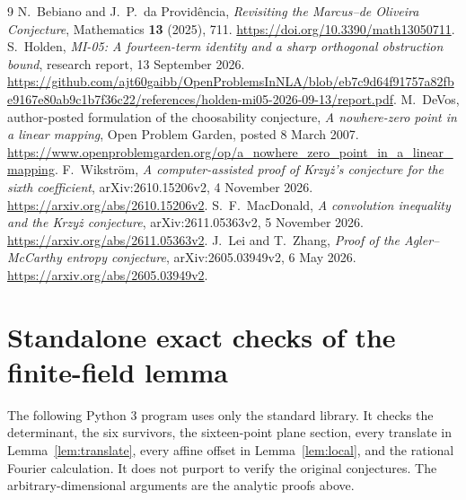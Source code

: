 \documentclass[11pt,a4paper]{article}
\begin{document}
\begin{thebibliography}{9}
N.~Bebiano and J.~P.~da Provid\^encia,
\emph{Revisiting the Marcus--de Oliveira Conjecture},
Mathematics \textbf{13} (2025), 711.
\url{https://doi.org/10.3390/math13050711}.
S.~Holden, \emph{MI-05: A fourteen-term identity and a sharp orthogonal
obstruction bound}, research report, 13 September 2026.
\url{https://github.com/ajt60gaibb/OpenProblemsInNLA/blob/eb7c9d64f91757a82fbe9167e80ab9c1b7f36c22/references/holden-mi05-2026-09-13/report.pdf}.
M.~DeVos, author-posted formulation of the choosability conjecture,
\emph{A nowhere-zero point in a linear mapping}, Open Problem Garden,
posted 8 March 2007.
\url{https://www.openproblemgarden.org/op/a_nowhere_zero_point_in_a_linear_mapping}.
F.~Wikstr\"om, \emph{A computer-assisted proof of Krzy\.{z}'s conjecture
for the sixth coefficient}, arXiv:2610.15206v2, 4 November 2026.
\url{https://arxiv.org/abs/2610.15206v2}.
S.~F.~MacDonald, \emph{A convolution inequality and the Krzy\.{z}
conjecture}, arXiv:2611.05363v2, 5 November 2026.
\url{https://arxiv.org/abs/2611.05363v2}.
J.~Lei and T.~Zhang, \emph{Proof of the Agler--McCarthy entropy
conjecture}, arXiv:2605.03949v2, 6 May 2026.
\url{https://arxiv.org/abs/2605.03949v2}.
\end{thebibliography}

\clearpage
\appendix
\section{Standalone exact checks of the finite-field lemma}

The following Python 3 program uses only the standard library. It checks
the determinant, the six survivors, the sixteen-point plane section,
every translate in Lemma~\ref{lem:translate}, every affine offset in
Lemma~\ref{lem:local}, and the rational Fourier calculation. It does
not purport to verify the original conjectures. The arbitrary-dimensional
arguments are the analytic proofs above.
\end{document}
